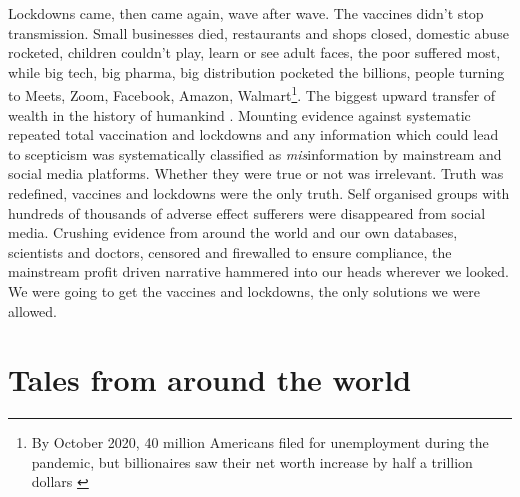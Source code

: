 \documentclass[11pt,a4paper,notitlepage]{report}
\begin{document}
Lockdowns came, then came again, wave after wave. The vaccines didn't stop transmission. Small businesses died, restaurants and shops closed, domestic abuse rocketed, children couldn't play, learn or see adult faces, the poor suffered most, while big tech, big pharma, big distribution pocketed the billions, people turning to Meets, Zoom, Facebook, Amazon, Walmart\footnote{By October 2020, 40 million Americans filed for unemployment during the pandemic, but billionaires saw their net worth increase by half a trillion dollars \cite{businessinsider30102020}}. The biggest upward transfer of wealth in the history of humankind \cite{oxfam17012022}. Mounting evidence against systematic repeated total vaccination and lockdowns and any information which could lead to scepticism was systematically classified as \textit{mis}information by mainstream and social media platforms. Whether they were true or not was irrelevant. Truth was redefined, vaccines and lockdowns were the only truth. Self organised groups with hundreds of thousands of adverse effect sufferers were disappeared from social media. Crushing evidence from around the world and our own databases, scientists and doctors, censored and firewalled to ensure compliance, the mainstream profit driven narrative hammered into our heads wherever we looked. We were going to get the vaccines and lockdowns, the only solutions we were allowed.

\section*{Tales from around the world}
\end{document}
